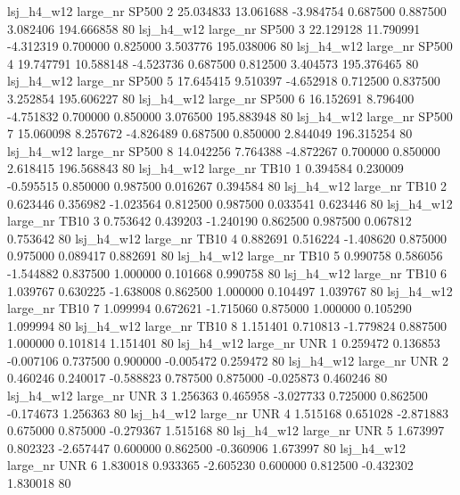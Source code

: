   lsj_h4_w12   large_nr    SP500                 2 25.034833 13.061688  -3.984754 0.687500 0.887500  3.082406  194.666858 80
  lsj_h4_w12   large_nr    SP500                 3 22.129128 11.790991  -4.312319 0.700000 0.825000  3.503776  195.038006 80
  lsj_h4_w12   large_nr    SP500                 4 19.747791 10.588148  -4.523736 0.687500 0.812500  3.404573  195.376465 80
  lsj_h4_w12   large_nr    SP500                 5 17.645415  9.510397  -4.652918 0.712500 0.837500  3.252854  195.606227 80
  lsj_h4_w12   large_nr    SP500                 6 16.152691  8.796400  -4.751832 0.700000 0.850000  3.076500  195.883948 80
  lsj_h4_w12   large_nr    SP500                 7 15.060098  8.257672  -4.826489 0.687500 0.850000  2.844049  196.315254 80
  lsj_h4_w12   large_nr    SP500                 8 14.042256  7.764388  -4.872267 0.700000 0.850000  2.618415  196.568843 80
  lsj_h4_w12   large_nr     TB10                 1  0.394584  0.230009  -0.595515 0.850000 0.987500  0.016267    0.394584 80
  lsj_h4_w12   large_nr     TB10                 2  0.623446  0.356982  -1.023564 0.812500 0.987500  0.033541    0.623446 80
  lsj_h4_w12   large_nr     TB10                 3  0.753642  0.439203  -1.240190 0.862500 0.987500  0.067812    0.753642 80
  lsj_h4_w12   large_nr     TB10                 4  0.882691  0.516224  -1.408620 0.875000 0.975000  0.089417    0.882691 80
  lsj_h4_w12   large_nr     TB10                 5  0.990758  0.586056  -1.544882 0.837500 1.000000  0.101668    0.990758 80
  lsj_h4_w12   large_nr     TB10                 6  1.039767  0.630225  -1.638008 0.862500 1.000000  0.104497    1.039767 80
  lsj_h4_w12   large_nr     TB10                 7  1.099994  0.672621  -1.715060 0.875000 1.000000  0.105290    1.099994 80
  lsj_h4_w12   large_nr     TB10                 8  1.151401  0.710813  -1.779824 0.887500 1.000000  0.101814    1.151401 80
  lsj_h4_w12   large_nr      UNR                 1  0.259472  0.136853  -0.007106 0.737500 0.900000 -0.005472    0.259472 80
  lsj_h4_w12   large_nr      UNR                 2  0.460246  0.240017  -0.588823 0.787500 0.875000 -0.025873    0.460246 80
  lsj_h4_w12   large_nr      UNR                 3  1.256363  0.465958  -3.027733 0.725000 0.862500 -0.174673    1.256363 80
  lsj_h4_w12   large_nr      UNR                 4  1.515168  0.651028  -2.871883 0.675000 0.875000 -0.279367    1.515168 80
  lsj_h4_w12   large_nr      UNR                 5  1.673997  0.802323  -2.657447 0.600000 0.862500 -0.360906    1.673997 80
  lsj_h4_w12   large_nr      UNR                 6  1.830018  0.933365  -2.605230 0.600000 0.812500 -0.432302    1.830018 80

